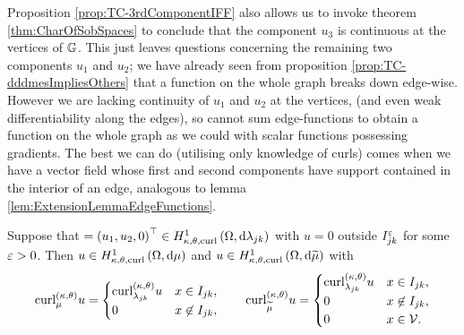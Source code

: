 Proposition \ref{prop:TC-3rdComponentIFF} also allows us to invoke theorem \ref{thm:CharOfSobSpaces} to conclude that the component $u_3$ is continuous at the vertices of $\mathbb{G}$.
This just leaves questions concerning the remaining two components $u_1$ and $u_2$; we have already seen from proposition \ref{prop:TC-dddmesImpliesOthers} that a function on the whole graph breaks down edge-wise.
However we are lacking continuity of $u_1$ and $u_2$ at the vertices, (and even weak differentiability along the edges), so cannot sum edge-functions to obtain a function on the whole graph as we could with scalar functions possessing gradients.
The best we can do (utilising only knowledge of curls) comes when we have a vector field whose first and second components have support contained in the interior of an edge, analogous to lemma \ref{lem:ExtensionLemmaEdgeFunctions}.
\begin{prop}
	Suppose that $=\left( u_1,u_2,0 \right)^\top\in H^1_{\kappa,\theta,\mathrm{curl}}\left( \Omega, \mathrm{d}\lambda_{jk} \right)$ with $u=0$ outside $I_{jk}^\varepsilon$ for some $\varepsilon>0$.
	Then $u\in H^1_{\kappa,\theta,\mathrm{curl}}\left( \Omega, \mathrm{d}\mu \right)$ and $u\in H^1_{\kappa,\theta,\mathrm{curl}}\left( \Omega, \mathrm{d}\widetilde{\mu} \right)$ with
	\begin{align*}
		\mathrm{curl}_{\mu}^{\left( \kappa, \theta \right)}u =
		\begin{cases} 
			\mathrm{curl}_{\lambda_{jk}}^{\left( \kappa, \theta \right)}u & x\in I_{jk}, \\
			0 & x\not\in I_{jk}, 
		\end{cases}
		\qquad
		\mathrm{curl}_{\widetilde{\mu}}^{\left( \kappa, \theta \right)}u = 
		\begin{cases} 
			\mathrm{curl}_{\lambda_{jk}}^{\left( \kappa, \theta \right)}u & x\in I_{jk}, \\
			0 & x\not\in I_{jk}, \\
			0 & x\in\mathcal{V}.
		\end{cases}
	\end{align*}
\end{prop}
